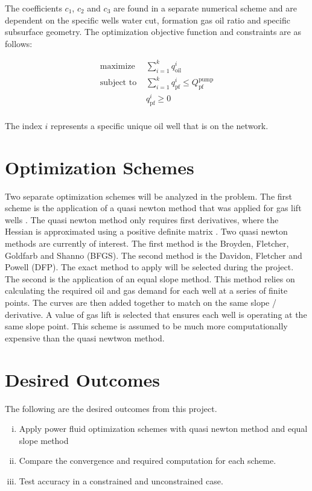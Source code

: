 \documentclass{article}
\begin{document}
The coefficients $c_{1}$, $c_{2}$ and $c_{3}$ are found in a separate numerical scheme and are dependent on the specific wells water cut, formation gas oil ratio and specific subsurface geometry. The optimization objective function and constraints are as follows:

\begin{equation*}
\begin{aligned}
    \text{maximize } & \sum_{i=1}^{k} q_{\text{oil}}^{i} \\
    \text{subject to } & \sum_{i=1}^{k} q_{\text{pf}}^{i} \leq Q_{\text{pf}}^{\text{pump}} \\
    & q_{\text{pf}}^{i} \geq 0 \\
\end{aligned}
\end{equation*}

The index $i$ represents a specific unique oil well that is on the network.

\section{Optimization Schemes}

Two separate optimization schemes will be analyzed in the problem. The first scheme is the application of a quasi newton method that was applied for gas lift wells \cite{gas_lift_quasi}. The quasi newton method only requires first derivatives, where the Hessian is approximated using a positive definite matrix \cite{optm_griva}. Two quasi newton methods are currently of interest. The first method is the Broyden, Fletcher, Goldfarb and Shanno (BFGS). The second method is the Davidon, Fletcher and Powell (DFP). The exact method to apply will be selected during the project.\\

The second is the application of an equal slope method. This method relies on calculating the required oil and gas demand for each well at a series of finite points. The curves are then added together to match on the same slope / derivative. A value of gas lift is selected that ensures each well is operating at the same slope point. \cite{gas_lift_econ} This scheme is assumed to be much more computationally expensive than the quasi newtwon method.

\section{Desired Outcomes}

The following are the desired outcomes from this project.

\begin{enumerate}[i)]
    \item Apply power fluid optimization schemes with quasi newton method and equal slope method
    \item Compare the convergence and required computation for each scheme.
    \item Test accuracy in a constrained and unconstrained case.
\end{enumerate}

\printbibliography
\end{document}

